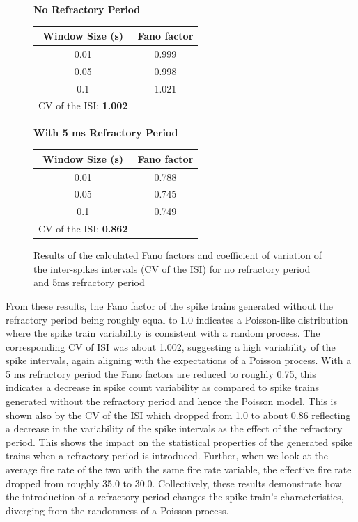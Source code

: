 \documentclass[11pt]{article}
\begin{document}
\begin{figure}[ht]
\begin{minipage}[t]{0.5\textwidth}
\vspace{1mm}
\centering
\textbf{No Refractory Period}
\begin{tabular}{cc}
\toprule
Window Size (s) & Fano factor \\
\midrule
0.01 & 0.999 \\
0.05 & 0.998 \\
0.1  & 1.021 \\
\bottomrule
CV of the ISI: \textbf{1.002}
\end{tabular}
\end{minipage}
\begin{minipage}[t]{0.5\textwidth} %
\vspace{1mm}
\centering
\textbf{With 5 ms Refractory Period}
\begin{tabular}{cc}
\toprule
Window Size (s) & Fano factor \\
\midrule
0.01 & 0.788 \\
0.05 & 0.745 \\
0.1  & 0.749 \\
\bottomrule
CV of the ISI: \textbf{0.862}\\
\end{tabular}
\vspace{1mm}
\end{minipage}
\caption{Results of the calculated Fano factors and coefficient of variation of the inter-spikes intervals (CV of the ISI) for no refractory period and 5ms refractory period}
\label{fig:results1}
\end{figure}
From these results, the Fano factor of the spike trains generated without the refractory period being roughly equal to 1.0 indicates a Poisson-like distribution where the spike train variability is consistent with a random process. The corresponding CV of ISI was about 1.002, suggesting a high variability of the spike intervals, again aligning with the expectations of a Poisson process. With a 5 ms refractory period the Fano factors are reduced to roughly 0.75, this indicates a decrease in spike count variability as compared to spike trains generated without the refractory period and hence the Poisson model. This is shown also by the CV of the ISI which dropped from 1.0 to about 0.86 reflecting a decrease in the variability of the spike intervals as the effect of the refractory period. This shows the impact on the statistical properties of the generated spike trains when a refractory period is introduced. Further, when we look at the average fire rate of the two with the same fire rate variable, the effective fire rate dropped from roughly 35.0 to 30.0. Collectively, these results demonstrate how the introduction of a refractory period changes the spike train’s characteristics, diverging from the randomness of a Poisson process.
\end{document}
